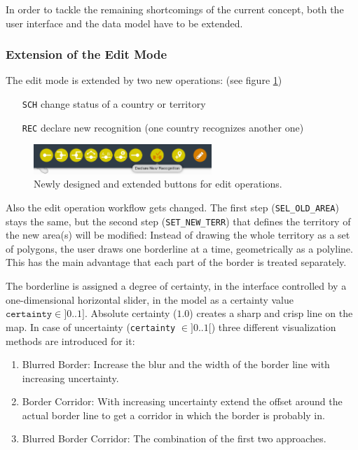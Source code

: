 In order to tackle the remaining shortcomings of the current concept, both the user interface and the data model have to be extended.

\subsubsection{Extension of the Edit Mode} %
\label{ssub:extension_of_the_edit_mode}

The edit mode is extended by two new operations: (see figure \ref{fig:edit_mode_extension})
\begin{itemize}
  \item [\texttt{SCH}] change status of a country or territory
  \item [\texttt{REC}] declare new recognition (one country recognizes another one)
\end{itemize}

\begin{figure}[ht]
  \centering
  \includegraphics[width = 0.6\textwidth]{graphics/5-uncertainty/edit_mode_extension.png}
  \caption{Newly designed and extended buttons for edit operations.}
  \label{fig:edit_mode_extension}
\end{figure}

Also the edit operation workflow gets changed. The first step (\texttt{SEL\_OLD\_AREA}) stays the same, but the second step (\texttt{SET\_NEW\_TERR}) that defines the territory of the new area(s) will be modified: Instead of drawing the whole territory as a set of polygons, the user draws one borderline at a time, geometrically as a polyline. This has the main advantage that each part of the border is treated separately.

The borderline is assigned a degree of certainty, in the interface controlled by a one-dimensional horizontal slider, in the model as a certainty value ~$\texttt{certainty} \in ]0 .. 1]$. Absolute certainty ($1.0$) creates a sharp and crisp line on the map. In case of uncertainty (\texttt{certainty} $\in ]0..1[$) three different visualization methods are introduced for it:

\begin{enumerate}
  \item Blurred Border: Increase the blur and the width of the border line with increasing uncertainty.
  \item Border Corridor: With increasing uncertainty extend the offset around the actual border line to get a corridor in which the border is probably in.
  \item Blurred Border Corridor: The combination of the first two approaches.
\end{enumerate}

